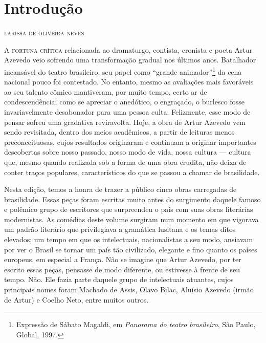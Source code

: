 \renewcommand{\fala}[1]{\noindent\quad\textsc{#1} ---}

\chapter[Introdução, \emph{por Larissa de Oliveira Neves}]{Introdução}

\begin{flushright}
\textsc{larissa de oliveira neves}
\end{flushright}

\textsc{A fortuna crítica} relacionada ao dramaturgo, contista, cronista e poeta
Artur Azevedo veio sofrendo uma transformação gradual nos últimos anos.
Batalhador incansável do teatro brasileiro, seu papel como “grande
animador”\footnote{ Expressão de Sábato Magaldi, em \textit{Panorama do teatro
brasileiro}, São Paulo, Global, 1997.} da cena nacional pouco foi contestado. No
entanto, mesmo as avaliações mais favoráveis ao seu talento cômico
mantiveram, por muito tempo, certo ar de condescendência; como se
apreciar o anedótico, o engraçado, o burlesco fosse invariavelmente
desabonador para uma pessoa culta. Felizmente, esse modo de pensar
sofreu uma gradativa reviravolta. Hoje, a obra de Artur Azevedo vem
sendo revisitada, dentro dos meios acadêmicos, a partir de leituras
menos preconceituosas, cujos resultados originaram e continuam a
originar importantes descobertas sobre nosso passado, nosso modo
de vida, nossa cultura --- cultura que, mesmo quando
realizada sob a forma de uma obra erudita, não deixa de conter traços
populares, característicos do que se passou a chamar de brasilidade.

Nesta edição, temos a honra de trazer a público cinco obras carregadas
de brasilidade. Essas peças foram escritas muito antes do surgimento
daquele famoso e polêmico grupo de escritores que surpreendeu o país
com suas obras literárias modernistas. As comédias deste volume
surgiram num momento em que vigorava um padrão literário que
privilegiava a gramática lusitana e os temas ditos elevados; um tempo em
que os intelectuais, nacionalistas a seu modo, ansiavam por ver o
Brasil se tornar um país tão civilizado, elegante e fino quanto os
países europeus, em especial a França. Não se imagine que Artur
Azevedo, por ter escrito essas peças, pensasse de modo diferente, ou
estivesse à frente de seu tempo. Não. Ele fazia parte daquele grupo de
intelectuais atuantes, cujos principais nomes foram Machado de Assis,
Olavo Bilac, Aluísio Azevedo (irmão de Artur) e Coelho Neto, entre
muitos outros. 

